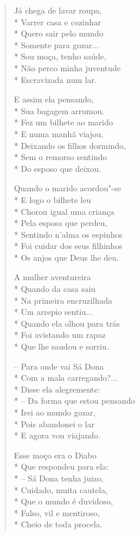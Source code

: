 \begin{verse}
Já chega de lavar roupa,\\*
Varrer casa e cozinhar\\*
Quero sair pelo mundo\\*
Somente para gozar...\\*
Sou moça, tenho saúde,\\*
Não perco minha juventude\\*
Escravizada num lar.

E assim ela pensando,\\*
Sua bagagem arrumou.\\*
Fez um bilhete ao marido\\*
E numa manhã viajou,\\*
Deixando os filhos dormindo,\\*
Sem o remorso sentindo\\*
Do esposo que deixou.

Quando o marido acordou"-se\\*
E logo o bilhete leu\\*
Chorou igual uma criança\\*
Pela esposa que perdeu,\\*
Sentindo n'alma os espinhos\\*
Foi cuidar dos seus filhinhos\\*
Os anjos que Deus lhe deu.

A mulher aventureira\\*
Quando da casa saiu\\*
Na primeira encruzilhada\\*
Um arrepio sentiu...\\*
Quando ela olhou para trás\\*
Foi avistando um rapaz\\*
Que lhe saudou e sorriu.

--  Para onde vai Sá Dona\\*
Com a mala carregando?...\\*
Disse ela alegremente:\\*
--  Da forma que estou pensando\\*
Irei ao mundo gozar,\\*
Pois abandonei o lar\\*
E agora vou viajando.

Esse moço era o Diabo\\*
Que respondeu para ela:\\*
--  Sá Dona tenha juizo,\\*
Cuidado, muita cautela,\\*
Que o mundo é duvidoso,\\*
Falso, vil e mentiroso,\\*
Cheio de toda procela.


\end{verse}

